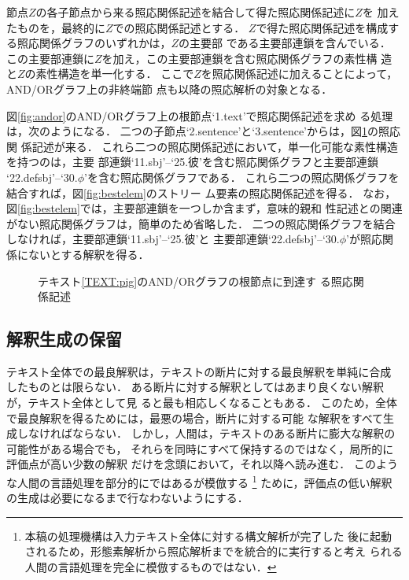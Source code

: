 節点$Z$の各子節点から来る照応関係記述を結合して得た照応関係記述に$Z$を
加えたものを，最終的に$Z$での照応関係記述とする．
$Z$で得た照応関係記述を構成する照応関係グラフのいずれかは，$Z$の主要部
である主要部連鎖を含んでいる．
この主要部連鎖に$Z$を加え，この主要部連鎖を含む照応関係グラフの素性構
造と$Z$の素性構造を単一化する．
ここで$Z$を照応関係記述に加えることによって，AND/ORグラフ上の非終端節
点も以降の照応解析の対象となる．

図\ref{fig:andor}のAND/ORグラフ上の根節点`1.text'で照応関係記述を求め
る処理は，次のようになる．
二つの子節点`2.sentence'と`3.sentence'からは，図\ref{fig:cor}の照応関
係記述が来る．
これら二つの照応関係記述において，単一化可能な素性構造を持つのは，主要
部連鎖`11.sbj'--`25.彼'を含む照応関係グラフと主要部連鎖
`22.defsbj'--`30.$\phi$'を含む照応関係グラフである．
これら二つの照応関係グラフを結合すれば，図\ref{fig:bestelem}のストリー
ム要素の照応関係記述を得る．
なお，図\ref{fig:bestelem}では，主要部連鎖を一つしか含まず，意味的親和
性記述との関連がない照応関係グラフは，簡単のため省略した．
二つの照応関係グラフを結合しなければ，主要部連鎖`11.sbj'--`25.彼'と
主要部連鎖`22.defsbj'--`30.$\phi$'が照応関係にないとする解釈を得る．
\begin{figure}[htbp]
\begin{center}
\end{center}
\caption{テキスト\protect\ref{TEXT:pig}のAND/ORグラフの根節点に到達す
る照応関係記述}
\label{fig:cor}
\end{figure}

\vspace*{-0.3mm}
\subsection{解釈生成の保留}
\label{sec:lazy:suspend}
\vspace*{-0.2mm}

テキスト全体での最良解釈は，テキストの断片に対する最良解釈を単純に合成
したものとは限らない．
ある断片に対する解釈としてはあまり良くない解釈が，テキスト全体として見
ると最も相応しくなることもある．
このため，全体で最良解釈を得るためには，最悪の場合，断片に対する可能
な解釈をすべて生成しなければならない．
しかし，人間は，テキストのある断片に膨大な解釈の可能性がある場合でも，
それらを同時にすべて保持するのではなく，局所的に評価点が高い少数の解釈
だけを念頭において，それ以降へ読み進む\cite{Tsujii88}．
このような人間の言語処理を部分的にではあるが模倣する
\footnote{本稿の処理機構は入力テキスト全体に対する構文解析が完了した
後に起動されるため，形態素解析から照応解析までを統合的に実行すると考え
られる人間の言語処理を完全に模倣するものではない．}
ために，評価点の低い解釈の生成は必要になるまで行なわないようにする．

